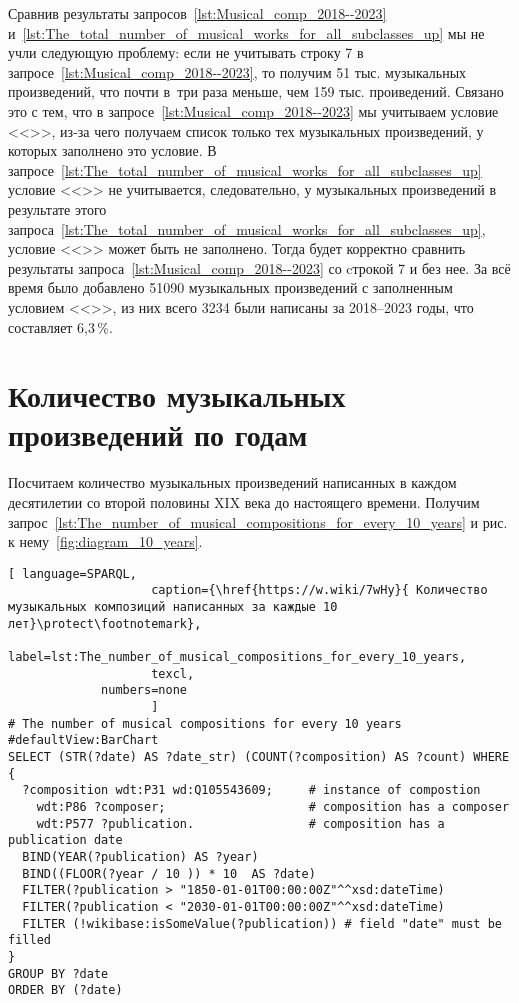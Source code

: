 Сравнив результаты запросов~\ref{lst:Musical_comp_2018--2023} и~\ref{lst:The_total_number_of_musical_works_for_all_subclasses_up} мы не учли следующую проблему: если не учитывать строку 7 в запросе~\ref{lst:Musical_comp_2018--2023}, то получим \num{51} тыс. музыкальных произведений, что почти в~три раза меньше, чем \num{159} тыс. проиведений. Связано это с тем, что в запросе~\ref{lst:Musical_comp_2018--2023} мы учитываем условие <<>>, из-за чего получаем список только тех музыкальных произведений, у которых заполнено это условие. В запросе~\ref{lst:The_total_number_of_musical_works_for_all_subclasses_up} условие  <<>> не учитывается, следовательно, у музыкальных произведений в результате этого запроса~\ref{lst:The_total_number_of_musical_works_for_all_subclasses_up}, условие <<>> может быть не заполнено. Тогда будет корректно сравнить результаты запроса~\ref{lst:Musical_comp_2018--2023} со cтрокой 7 и без нее. За всё время было добавлено \num{51090} музыкальных произведений с заполненным условием <<>>, из них всего \num{3234} были написаны за 2018--2023 годы, что составляет 6,3\,\%.

\section{Количество музыкальных произведений по годам}
Посчитаем количество музыкальных произведений написанных в каждом десятилетии со второй половины XIX века до настоящего времени. Получим запрос~\ref{lst:The_number_of_musical_compositions_for_every_10_years} и рис. к нему~\ref{fig:diagram_10_years}.

\begin{lstlisting}[ language=SPARQL,
                    caption={\href{https://w.wiki/7wHy}{ Количество музыкальных композиций написанных за каждые 10 лет}\protect\footnotemark},
                    label=lst:The_number_of_musical_compositions_for_every_10_years,
                    texcl,
	         numbers=none
                    ]
# The number of musical compositions for every 10 years
#defaultView:BarChart
SELECT (STR(?date) AS ?date_str) (COUNT(?composition) AS ?count) WHERE {
  ?composition wdt:P31 wd:Q105543609;     # instance of compostion
    wdt:P86 ?composer;                    # composition has a composer
    wdt:P577 ?publication.                # composition has a publication date
  BIND(YEAR(?publication) AS ?year)
  BIND((FLOOR(?year / 10 )) * 10  AS ?date)
  FILTER(?publication > "1850-01-01T00:00:00Z"^^xsd:dateTime)
  FILTER(?publication < "2030-01-01T00:00:00Z"^^xsd:dateTime) 
  FILTER (!wikibase:isSomeValue(?publication)) # field "date" must be filled
}
GROUP BY ?date
ORDER BY (?date)
\end{lstlisting}%

